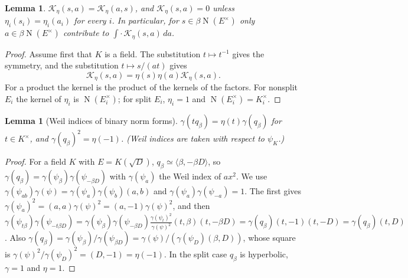 \documentclass[11pt,oneside,notitlepage]{book}
\numberwithin{equation}{section}
\theoremstyle{plain}
\newtheorem{lemma}[theorem]{Lemma}
\theoremstyle{definition}
\newcommand{\N}{\operatorname{N}}
\newcommand{\hil}[2]{(#1,#2)}
\begin{document}
\begin{lemma}\label{lem:kernel-props}
$\mathcal K_\eta(s,a)=\mathcal K_\eta(a,s)$, and $\mathcal K_\eta(s,a)=0$ unless $\eta_i(s_i)=\eta_i(a_i)$ for every $i$. In particular, for $s\in\beta\N(E^\times)$ only $a\in\beta\N(E^\times)$ contribute to $\int\cdot\,\mathcal K_\eta(s,a)\,da$.
\end{lemma}
\begin{proof}
Assume first that $K$ is a field. The substitution $t\mapsto t^{-1}$ gives the symmetry, and the substitution $t\mapsto s/(at)$ gives\[\mathcal K_\eta(s,a)=\eta(s)\eta(a)\mathcal K_\eta(s,a).\] For a product the kernel is the product of the kernels of the factors. For nonsplit $E_i$ the kernel of $\eta_i$ is $\N(E_i^\times)$; for split $E_i$, $\eta_i=1$ and $\N(E_i^\times)=K_i^\times$.
\end{proof}

\begin{lemma}[Weil indices of binary norm forms]\label{lem:weil-index}
$\gamma(tq_\beta)=\eta(t)\gamma(q_\beta)$ for $t\in K^\times$, and $\gamma(q_\beta)^2=\eta(-1)$. (Weil indices are taken with respect to $\psi_K$.)
\end{lemma}
\begin{proof}
For a field $K$ with $E=K(\sqrt D)$, $q_\beta\simeq\langle\beta,-\beta D\rangle$, so $\gamma(q_\beta)=\gamma(\psi_\beta)\gamma(\psi_{-\beta D})$ with $\gamma(\psi_a)$ the Weil index of $ax^2$. We use $\gamma(\psi_{ab})\gamma(\psi)=\gamma(\psi_a)\gamma(\psi_b)\hil ab$ and $\gamma(\psi_a)\gamma(\psi_{-a})=1$. The first gives $\gamma(\psi_a)^2=\hil aa\gamma(\psi)^2=\hil a{-1}\gamma(\psi)^2$, and then
$\gamma(\psi_{t\beta})\gamma(\psi_{-t\beta D})=\gamma(\psi_\beta)\gamma(\psi_{-\beta D})\frac{\gamma(\psi_t)^2}{\gamma(\psi)^2}\hil t\beta\hil t{-\beta D}=\gamma(q_\beta)\hil t{-1}\hil t{-D}=\gamma(q_\beta)\hil tD$. Also $\gamma(q_\beta)=\gamma(\psi_\beta)/\gamma(\psi_{\beta D})=\gamma(\psi)/(\gamma(\psi_D)\hil\beta D)$, whose square is $\gamma(\psi)^2/\gamma(\psi_D)^2=\hil D{-1}=\eta(-1)$. In the split case $q_\beta$ is hyperbolic, $\gamma=1$ and $\eta=1$.
\end{proof}
\end{document}
